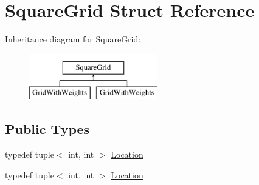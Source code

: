 \hypertarget{structSquareGrid}{}\section{Square\+Grid Struct Reference}
\label{structSquareGrid}
Inheritance diagram for Square\+Grid\+:\begin{figure}[H]
\begin{center}
\leavevmode
\includegraphics[height=2.000000cm]{structSquareGrid}
\end{center}
\end{figure}
\subsection*{Public Types}
\begin{DoxyCompactItemize}
\item 
typedef tuple$<$ int, int $>$ \mbox{\hyperlink{structSquareGrid_a2c9a2cbd3912aa48ac97289abc3f1c0f}{Location}}
\item 
typedef tuple$<$ int, int $>$ \mbox{\hyperlink{structSquareGrid_a2c9a2cbd3912aa48ac97289abc3f1c0f}{Location}}
\end{DoxyCompactItemize}
